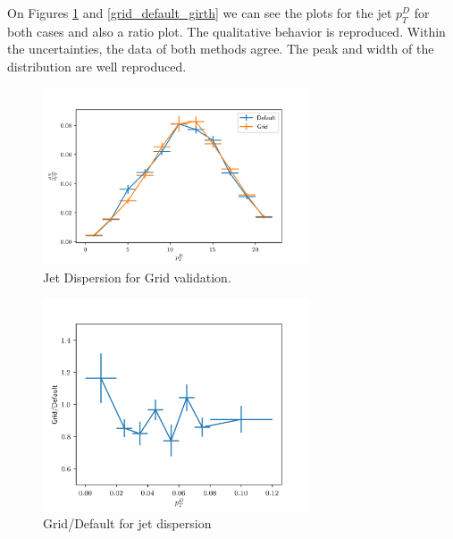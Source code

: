 On Figures \ref{grid_dispersion_validation} and \ref{grid_default_girth} we can see the plots for the jet $p_T^D$ for both cases and also a ratio plot. The qualitative behavior is reproduced. Within the uncertainties, the data of both methods agree. The peak and width of the distribution are well reproduced.

\begin{figure}
\includegraphics[width=0.7\textwidth]{images/grid_dispersion_validation.png}
\caption[Jet Dispersion for Grid validation.]{Jet Dispersion for Grid validation.}
\label{grid_dispersion_validation}
\end{figure}

\begin{figure}
\includegraphics[width=0.7\textwidth]{images/grid_default_dispersion.png}
\caption[Grid/Default for jet dispersion]{Grid/Default for jet dispersion}
\label{grid_default_dispersion}
\end{figure}